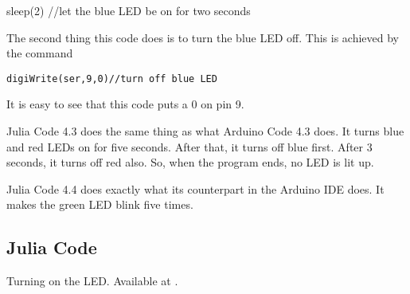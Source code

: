 sleep(2)  //let the blue LED be on for two seconds

The second thing this code does is to turn the blue LED off. This is achieved
by the command

\begin{lstlisting}[style=nonumbers]
     digiWrite(ser,9,0)//turn off blue LED
  \end{lstlisting}

It is easy to see that this code puts a 0 on pin 9.

Julia Code 4.3 does the same thing as what Arduino Code 4.3 does. It turns
blue and red LEDs on for five seconds. After that, it turns off blue first. After
3 seconds, it turns off red also. So, when the program ends, no LED is lit up.

Julia Code 4.4 does exactly what its counterpart in the Arduino IDE does.
It makes the green LED blink five times. 

\subsection{Julia Code}
\lstset{style=mystyle}
\label{sec:led-julia-code}

\begin{juliacode}
{Turning on the LED.  Available at
  .}
\label{julia:led-blue}

\end{juliacode}

\begin{juliacode}
\label{julia:led-blue-delay}

\end{juliacode}

\begin{juliacode}
\label{juila:led-bmoe-red}

\end{juliacode}

\begin{juliacode}
\label{julia:lemogreen-blink}

\end{juliacode}

